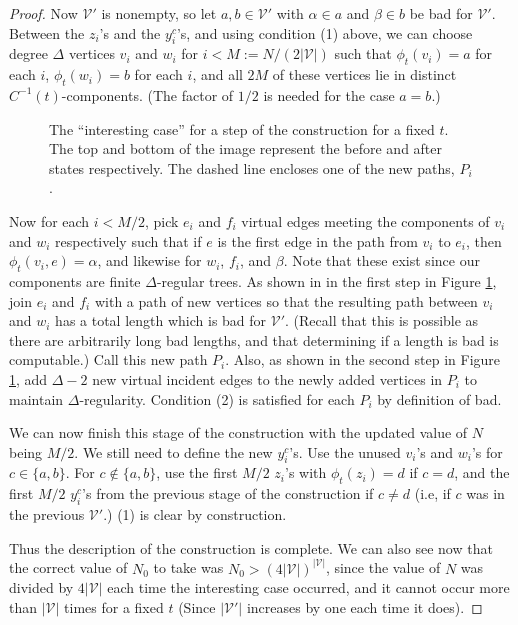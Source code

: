 \documentclass[10pt,a4paper]{amsart}
\newcommand{\inv}{^{-1}}
\begin{document}
\begin{proof}
Now $\mathcal{V}'$ is nonempty, so let $a,b \in \mathcal{V}'$ with $\alpha \in a$ and $\beta \in b$ be bad for $\mathcal{V}'$. Between the $z_i$'s and the $y_i^c$'s, and using condition (1) above, we can choose degree $\Delta$ vertices $v_i$ and $w_i$ for $i < M := N/(2|\mathcal{V}|)$ such that $\phi_t(v_i) = a$ for each $i$, $\phi_t(w_i) = b$ for each $i$, and all $2M$ of these vertices lie in distinct $C\inv(t)$-components. (The factor of $1/2$ is needed for the case $a = b$.)

\begin{figure}
    \centering
    
    \caption{The ``interesting case'' for a step of the construction for a fixed $t$. The top and bottom of the image represent the before and after states respectively. The dashed line encloses one of the new paths, $P_i$.}
    \label{fig:join}
\end{figure}

Now for each $i < M / 2$, pick $e_i$ and $f_i$ virtual edges meeting the components of $v_i$ and $w_i$ respectively such that if $e$ is the first edge in the path from $v_i$ to $e_i$, then $\phi_t(v_i,e) = \alpha$, and likewise for $w_i$, $f_i$, and $\beta$. Note that these exist since our components are finite $\Delta$-regular trees. As shown in in the first step in Figure \ref{fig:join}, join $e_i$ and $f_i$ with a path of new vertices so that the resulting path between $v_i$ and $w_i$ has a total length which is bad for $\mathcal{V}'$. (Recall that this is possible as there are arbitrarily long bad lengths, and that determining if a length is bad is computable.) Call this new path $P_i$. Also, as shown in the second step in Figure \ref{fig:join}, add $\Delta-2$ new virtual incident edges to the newly added vertices in $P_i$ to maintain $\Delta$-regularity. Condition (2) is satisfied for each $P_i$ by definition of bad.

We can now finish this stage of the construction with the updated value of $N$ being $M/2$. We still need to define the new $y_i^c$'s. Use the unused $v_i$'s and $w_i$'s for $c \in \{a,b\}$. For $c \not\in \{a,b\}$, use the first $M/2$ $z_i$'s with $\phi_t(z_i) = d$ if $c = d$, and the first $M/2$ $y_i^{c}$'s from the previous stage of the construction if $c \neq d$ (i.e, if $c$ was in the previous $\mathcal{V}'$.) (1) is clear by construction.

Thus the description of the construction is complete. We can also see now that the correct value of $N_0$ to take was $N_0 > (4|\mathcal{V}|)^{|\mathcal{V}|}$, since the value of $N$ was divided by $4|\mathcal{V}|$ each time the interesting case occurred, and it cannot occur more than $|\mathcal{V}|$ times for a fixed $t$ (Since $|\mathcal{V}'|$ increases by one each time it does).



\end{proof}
\end{document}
